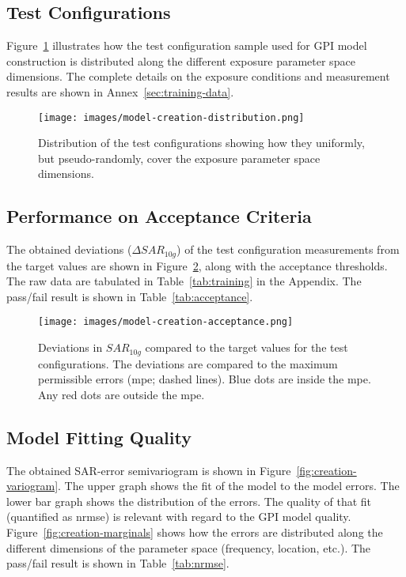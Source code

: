 \documentclass{article}
\begin{document}


\FloatBarrier
\subsection{Test Configurations}

Figure~\ref{fig:training-dist} illustrates how the test configuration sample used for GPI model construction is distributed along the different exposure parameter space dimensions. The complete details on the exposure conditions and measurement results are shown in Annex~\ref{sec:training-data}.

\begin{figure} \centering
\texttt{[image: images/model-creation-distribution.png]}
\caption{Distribution of the test configurations showing how they uniformly, but pseudo-randomly, cover the exposure parameter space dimensions.} \label{fig:training-dist}
\end{figure}

\FloatBarrier
\subsection{Performance on Acceptance Criteria}
The obtained deviations ($\Delta SAR_{10g}$) of the test configuration measurements from the target values are shown in Figure~\ref{fig:creation-acc}, along with the acceptance thresholds. The raw data are tabulated in Table~\ref{tab:training} in the Appendix.
The pass/fail result is shown in Table~\ref{tab:acceptance}.



\begin{figure}[H] \centering
\texttt{[image: images/model-creation-acceptance.png]}
\caption{Deviations in $SAR_{10g}$ compared to the target values for the test configurations. The deviations are compared to the maximum permissible errors (mpe; dashed lines). Blue dots are inside the mpe. Any red dots are outside the mpe.} \label{fig:creation-acc}
\end{figure}

\FloatBarrier
\subsection{Model Fitting Quality}
The obtained SAR-error semivariogram is shown in Figure~\ref{fig:creation-variogram}. The upper graph shows the fit of the model to the model errors. The lower bar graph shows the distribution of the errors. The quality of that fit (quantified as nrmse) is relevant with regard to the GPI model quality. Figure~\ref{fig:creation-marginals} shows how the errors are distributed along the different dimensions of the parameter space (frequency, location, etc.). The pass/fail result is shown in Table~\ref{tab:nrmse}.
\end{document}
